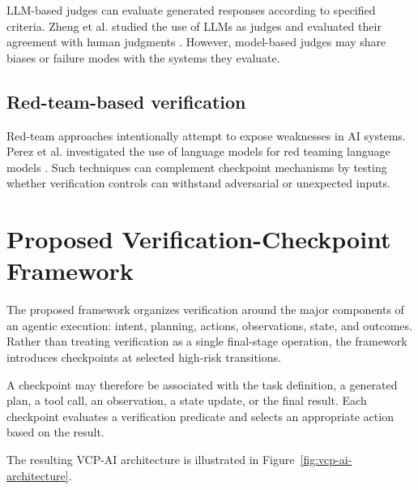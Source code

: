 \documentclass[12pt]{article}
\begin{document}
LLM-based judges can evaluate generated responses according to specified
criteria. Zheng et al. studied the use of LLMs as judges and evaluated their
agreement with human judgments \cite{zheng2023judge}. However, model-based
judges may share biases or failure modes with the systems they evaluate.

\subsection{Red-team-based verification}
\label{sec:red-team-verification}

Red-team approaches intentionally attempt to expose weaknesses in AI systems.
Perez et al. investigated the use of language models for red teaming language
models \cite{perez2022redteam}. Such techniques can complement checkpoint
mechanisms by testing whether verification controls can withstand adversarial
or unexpected inputs.

\section{Proposed Verification-Checkpoint Framework}
\label{sec:proposed-framework}

The proposed framework organizes verification around the major components of an
agentic execution: intent, planning, actions, observations, state, and
outcomes. Rather than treating verification as a single final-stage operation,
the framework introduces checkpoints at selected high-risk transitions.

A checkpoint may therefore be associated with the task definition, a generated
plan, a tool call, an observation, a state update, or the final result. Each
checkpoint evaluates a verification predicate and selects an appropriate action
based on the result.

The resulting VCP-AI architecture is illustrated in
Figure~\ref{fig:vcp-ai-architecture}.
\end{document}
